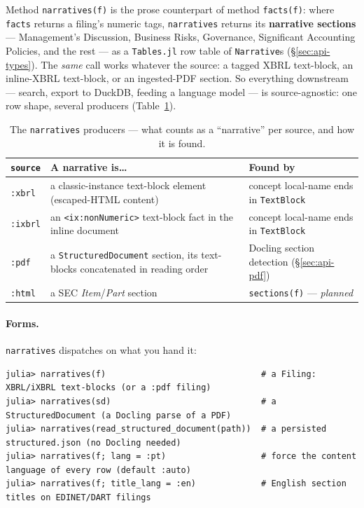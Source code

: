 \documentclass[11pt,a4paper]{report}
\begin{document}
Method \texttt{narratives(f)} is the prose counterpart of method \texttt{facts(f)}: where \texttt{facts} returns a
filing's numeric tags, \texttt{narratives} returns its \textbf{narrative sections} --- Management's
Discussion, Business Risks, Governance, Significant Accounting Policies, and the rest --- as a
\texttt{Tables.jl} row table of \texttt{Narrative}s (\S\ref{sec:api-types}). The \emph{same} call works
whatever the source: a tagged XBRL text-block, an inline-XBRL text-block, or an ingested-PDF section. So
everything downstream --- search, export to DuckDB, feeding a language model --- is source-agnostic: one row
shape, several producers (Table~\ref{tab:narrative-producers}).

\begin{table}[h]
\centering
\small
\caption{The \texttt{narratives} producers --- what counts as a ``narrative'' per source, and how it is found.}
\label{tab:narrative-producers}
\begin{tabular}{@{}p{}p{}p{}@{}}
\toprule
\textbf{\texttt{source}} & \textbf{A narrative is\ldots} & \textbf{Found by} \\
\midrule
\texttt{:xbrl} & a classic-instance text-block element (escaped-HTML content) & concept local-name ends in
  \texttt{TextBlock} \\
\texttt{:ixbrl} & an \texttt{<ix:nonNumeric>} text-block fact in the inline document & concept local-name ends
  in \texttt{TextBlock} \\
\texttt{:pdf} & a \texttt{StructuredDocument} section, its text-blocks concatenated in reading order &
  Docling section detection (\S\ref{sec:api-pdf}) \\
\texttt{:html} & a SEC \emph{Item}/\emph{Part} section & \texttt{sections(f)} --- \emph{planned} \\
\bottomrule
\end{tabular}
\end{table}

\paragraph{Forms.} \texttt{narratives} dispatches on what you hand it:
\begin{lstlisting}
julia> narratives(f)                               # a Filing: XBRL/iXBRL text-blocks (or a :pdf filing)
julia> narratives(sd)                              # a StructuredDocument (a Docling parse of a PDF)
julia> narratives(read_structured_document(path))  # a persisted structured.json (no Docling needed)
julia> narratives(f; lang = :pt)                   # force the content language of every row (default :auto)
julia> narratives(f; title_lang = :en)             # English section titles on EDINET/DART filings
\end{lstlisting}
\end{document}
